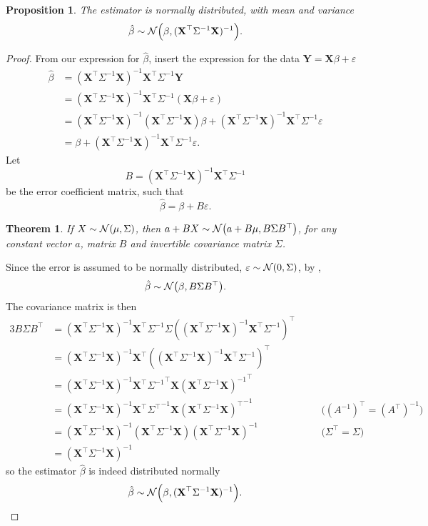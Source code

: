 \documentclass[letterpaper, reqno]{amsart}
\newtheorem{theorem}{Theorem}[section]
\newtheorem{prop}{Proposition}[section]
\numberwithin{equation}{section}
\newcommand{\T}{\top} %
\newcommand{\vect}[1]{\boldsymbol{\mathbf{#1}}} %
\newcommand{\N}[2]{\mathcal{N}\mleft( #1, #2 \mright)}
\newcommand{\by}[1]{&\quad&\text{(#1)}}
\newcommand{\Xm}{\vect{X}}
\newcommand{\Yv}{\vect{Y}}
\newcommand{\Bv}{\beta}
\newcommand{\Bvh}{\hat{\beta}}
\newcommand{\ve}{\varepsilon}
\begin{document}
\begin{prop} \label{prop:BvN}
  The estimator is normally distributed, with mean and variance
  \[ \Bvh \sim \N{\Bv}{(\Xm^\T \Sigma^{-1} \Xm)^{-1}}. \]
\end{prop}

\begin{proof}
  From our expression for $\Bvh$, insert the expression for the data $\Yv
  = \Xm\Bv + \ve$
  \begin{align*}
    \Bvh &= (\Xm^\T \Sigma^{-1} \Xm)^{-1} \Xm^\T \Sigma^{-1} \Yv \\
         &= (\Xm^\T \Sigma^{-1} \Xm)^{-1} \Xm^\T \Sigma^{-1} (\Xm\Bv + \ve) \\
         &= (\Xm^\T \Sigma^{-1} \Xm)^{-1} (\Xm^\T \Sigma^{-1} \Xm)\Bv 
          + (\Xm^\T \Sigma^{-1} \Xm)^{-1} \Xm^\T \Sigma^{-1} \ve \\
         &= \Bv + (\Xm^\T \Sigma^{-1} \Xm)^{-1} \Xm^\T \Sigma^{-1} \ve.
  \end{align*}
  Let
  \[ B = (\Xm^\T \Sigma^{-1} \Xm)^{-1} \Xm^\T \Sigma^{-1} \]
  be the error coefficient matrix, such that
  \[ \Bvh = \Bv + B\ve. \]

  \begin{theorem} \label{thm:Bx}
    If $X \sim \N{\mu}{\Sigma}$, then $a + BX \sim \N{a + B\mu}{B \Sigma B^\T}$,
    for any constant vector $a$, matrix $B$ and invertible covariance matrix
    $\Sigma$.
  \end{theorem}

  Since the error is assumed to be normally distributed,
  $\ve \sim \N{0}{\Sigma}$, by ,
  \[ \Bvh \sim \N{\Bv}{B \Sigma B^\T}. \]
  The covariance matrix is then
  \begin{alignat*}{3}
    B \Sigma B^\T &= (\Xm^\T \Sigma^{-1} \Xm)^{-1} \Xm^\T \Sigma^{-1} \Sigma
                    ((\Xm^\T \Sigma^{-1} \Xm)^{-1} \Xm^\T \Sigma^{-1})^\T \\
                  &= (\Xm^\T \Sigma^{-1} \Xm)^{-1} \Xm^\T 
                    ((\Xm^\T \Sigma^{-1} \Xm)^{-1} \Xm^\T \Sigma^{-1})^\T \\
                  &= (\Xm^\T \Sigma^{-1} \Xm)^{-1} \Xm^\T 
                    {\Sigma^{-1}}^\T \Xm {(\Xm^\T \Sigma^{-1} \Xm)^{-1}}^\T \\
                  &= (\Xm^\T \Sigma^{-1} \Xm)^{-1} \Xm^\T 
                    {\Sigma^\T}^{-1} \Xm {(\Xm^\T \Sigma^{-1} \Xm)^\T}^{-1}
                    \by{${(A^{-1})}^\T = {(A^\T)}^{-1}$} \\
                  &= (\Xm^\T \Sigma^{-1} \Xm)^{-1} 
                     (\Xm^\T \Sigma^{-1} \Xm) (\Xm^\T \Sigma^{-1} \Xm)^{-1}
                    \by{$\Sigma^\T = \Sigma$} \\
                  &= (\Xm^\T \Sigma^{-1} \Xm)^{-1} 
  \end{alignat*}
  so the estimator $\Bvh$ is indeed distributed normally
  \[ \Bvh \sim \N{\Bv}{(\Xm^\T \Sigma^{-1} \Xm)^{-1}}. \qedhere \]
\end{proof}
\end{document}
